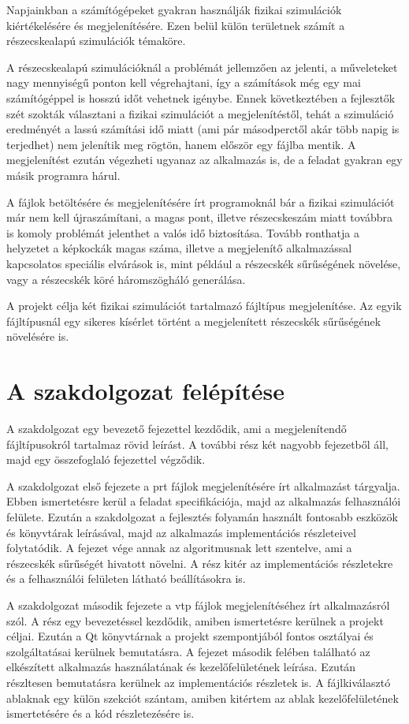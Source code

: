 Napjainkban a számítógépeket gyakran használják
fizikai szimulációk kiértékelésére
és megjelenítésére.
Ezen belül külön területnek számít
a részecskealapú szimulációk témaköre.

A részecskealapú 
szimulációknál a problémát jellemzően az jelenti,
a műveleteket nagy mennyiségű ponton kell végrehajtani,
így a számítások még egy 
mai számítógéppel is hosszú időt vehetnek igénybe.
Ennek következtében a fejlesztők szét szokták választani
a fizikai szimulációt a megjelenítéstől,
tehát a szimuláció eredményét 
a lassú számítási idő miatt
(ami pár másodperctől akár több napig is terjedhet)
nem jelenítik meg rögtön, 
hanem először egy fájlba mentik.
A megjelenítést ezután végezheti 
ugyanaz az alkalmazás is,
de a feladat gyakran egy másik programra hárul.

A fájlok betöltésére és megjelenítésére írt programoknál
bár a fizikai szimulációt már nem kell újraszámítani,
a magas pont, illetve részecskeszám miatt 
továbbra is komoly problémát
jelenthet a valós idő biztosítása.
Tovább ronthatja a helyzetet a képkockák magas száma,
illetve a megjelenítő alkalmazással kapcsolatos
speciális elvárások is, 
mint például a részecskék sűrűségének növelése,
vagy a részecskék köré háromszögháló generálása.

A projekt célja két fizikai szimulációt 
tartalmazó fájltípus megjelenítése.
Az egyik fájltípusnál egy sikeres kísérlet történt 
a megjelenített részecskék sűrűségének növelésére is.

\section{A szakdolgozat felépítése}

A szakdolgozat egy bevezető fejezettel kezdődik,
ami a megjelenítendő fájltípusokról tartalmaz
rövid leírást.
A további rész két nagyobb fejezetből áll, 
majd egy összefoglaló fejezettel végződik.

A szakdolgozat első fejezete a prt fájlok megjelenítésére
írt alkalmazást tárgyalja.
Ebben ismertetésre kerül a feladat specifikációja, 
majd az alkalmazás felhasználói felülete.
Ezután a szakdolgozat a fejlesztés folyamán 
használt fontosabb eszközök 
és könyvtárak leírásával, 
majd az alkalmazás 
implementációs részleteivel folytatódik.
A fejezet vége annak az algoritmusnak lett szentelve,
ami a részecskék sűrűségét hivatott növelni.
A rész kitér az implementációs részletekre
és a felhasználói felületen látható beállításokra is.

A szakdolgozat második fejezete 
a vtp fájlok megjelenítéséhez írt alkalmazásról szól.
A rész egy bevezetéssel kezdődik,
amiben ismertetésre kerülnek a projekt céljai. 
Ezután a Qt könyvtárnak 
a projekt szempontjából fontos osztályai
és szolgáltatásai kerülnek bemutatásra.
A fejezet második felében található az elkészített alkalmazás
használatának és kezelőfelületének leírása.
Ezután részltesen bemutatásra kerülnek az implementációs részletek is.
A fájlkiválasztó ablaknak egy külön szekciót szántam,
amiben kitértem az ablak kezelőfelületének ismertetésére
és a kód részletezésére is.

